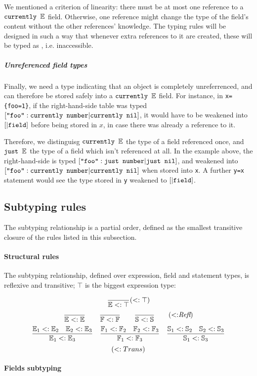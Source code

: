 We mentioned a criterion of linearity: there must be at most one
reference to a $\texttt{currently }\mathbb{E}$ field. Otherwise, one reference might change
the type of the field's content without the other references'
knowledge. The typing rules will be designed in such a way that
whenever extra references to it are created, these will be typed as
\F, i.e. inaccessible.

\subparagraph{Unreferenced field types}

Finally, we need a type indicating that an object is completely
unreferrenced, and can therefore be stored safely into a $\texttt{currently }\mathbb{E}$
field. For instance, in {\tt x=\{foo=1\}}, if the right-hand-side
table was typed $[\texttt{"foo"}:\texttt{currently }\texttt{number}| \allowbreak \texttt{currently }\texttt{nil}]$, it
would have to be weakened into $[|\texttt{field}]$ before being stored in $x$, in
case there was already a reference to it. 

Therefore, we distinguisg $\texttt{currently }\mathbb{E}$ the type of a field referenced
once, and $\texttt{just }\mathbb{E}$ the type of a field which isn't referenced at
all. In the example above, the right-hand-side is typed
$[\texttt{"foo"}:\texttt{just }\texttt{number}|\texttt{just }\texttt{nil}]$, and weakened into
$[\texttt{"foo"}:\texttt{currently }\texttt{number}| \allowbreak \texttt{cur}\-\texttt{rently
  }\texttt{nil}]$ when stored into \verb+x+. A further \verb+y=x+ statement
would see the type stored in \verb+y+ weakened to $[|\texttt{field}]$.

\subsection{Subtyping rules}
The subtyping relationship is a partial order, defined as the smallest
transitive closure of the rules listed in this subsection.

\paragraph{Structural rules}
The subtyping relationship, defined over expression, field and
statement types, is reflexive and transitive; $\top$ is the biggest
expression type:

$$
\frac{}{
\mathbb{E} <: \top
}(\textit{$<:\top$})
$$
$$
\frac{}{\mathbb{E}<:\mathbb{E}}
\qquad
\frac{}{\mathbb{F}<:\mathbb{F}}
\qquad
\frac{}{\mathbb{S}<:\mathbb{S}}
\qquad
(\textit{$<:$Refl})
$$
$$
\frac{\mathbb{E}_1<:\mathbb{E}_2 \quad \mathbb{E}_2 <: \mathbb{E}_3}{\mathbb{E}_1<:\mathbb{E}_3}
\quad
\frac{\mathbb{F}_1<:\mathbb{F}_2 \quad \mathbb{F}_2 <: \mathbb{F}_3}{\mathbb{F}_1<:\mathbb{F}_3}
\quad
\frac{\mathbb{S}_1<:\mathbb{S}_2 \quad \mathbb{S}_2 <: \mathbb{S}_3}{\mathbb{S}_1<:\mathbb{S}_3}
$$
$$
(\textit{$<:Trans$})
$$


\paragraph{Fields subtyping}

